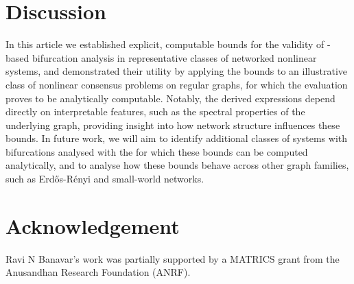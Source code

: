 \documentclass[letterpaper, 10 pt, conference]{ieeeconf}
\begin{document}

\section{Discussion}
\label{sec:conclusion}

In this article we established explicit, computable bounds for the validity of \LSR{}-based bifurcation analysis in representative classes of networked nonlinear systems, and demonstrated their utility by applying the bounds to an illustrative class of nonlinear consensus problems on regular graphs, for which the evaluation proves to be analytically computable.
Notably, the derived expressions depend directly on interpretable features, such as the spectral properties of the underlying graph, providing insight into how network structure influences these bounds.
In future work, we will aim to identify additional classes of systems with bifurcations analysed with the \LSR{} for which these bounds can be computed analytically, and to analyse how these bounds behave across other graph families, such as Erdős-Rényi and small-world networks.


\section{Acknowledgement}

Ravi N Banavar's work was partially supported by a MATRICS grant from the Anusandhan Research Foundation (ANRF).




\end{document}
